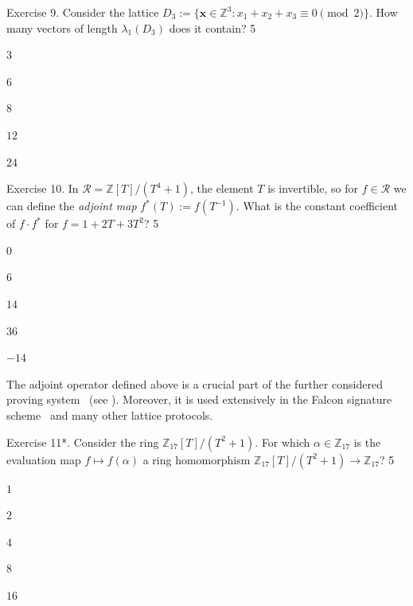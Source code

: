 \documentclass[../../book.tex]{subfiles}
\begin{document}
\begin{xexercise}
    {Exercise 9.}
    {Consider the lattice $D_3 := \{\mathbf{x} \in \mathbb{Z}^3: x_1 + x_2 + x_3 \equiv 0 \pmod 2\}$. How many vectors of length $\lambda_1(D_3)$ does it contain?}
    {5}
    {
        \item $3$
        \item $6$
        \item $8$
        \item $12$
        \item $24$
    }
\end{xexercise}
 
\begin{xexercise}
    {Exercise 10.}
    {In $\mathcal{R} = \mathbb{Z}[T]/(T^4+1)$, the element $T$ is invertible, so for $f \in \mathcal{R}$ we can define the \emph{adjoint map} $f^{\ast}(T) := f(T^{-1})$. What is the constant coefficient of $f \cdot f^{\ast}$ for $f = 1 + 2T + 3T^2$?}
    {5}
    {
        \item $0$
        \item $6$
        \item $14$
        \item $36$
        \item $-14$
    }
\end{xexercise}

\begin{remark}
    The adjoint operator defined above is a crucial part of the further considered proving system~\cite{C:LyuNguPla22} (see ).
    Moreover, it is used extensively in the Falcon signature scheme~\cite{falcon-spec} and many other lattice protocols.
\end{remark}
 
\begin{xexercise}
    {Exercise 11*.}
    {Consider the ring $\mathbb{Z}_{17}[T]/(T^2+1)$. For which $\alpha \in \mathbb{Z}_{17}$ is the evaluation map $f \mapsto f(\alpha)$ a ring homomorphism $\mathbb{Z}_{17}[T]/(T^2+1) \to \mathbb{Z}_{17}$?}
    {5}
    {
        \item $1$
        \item $2$
        \item $4$
        \item $8$
        \item $16$
    }
\end{xexercise}
\end{document}
